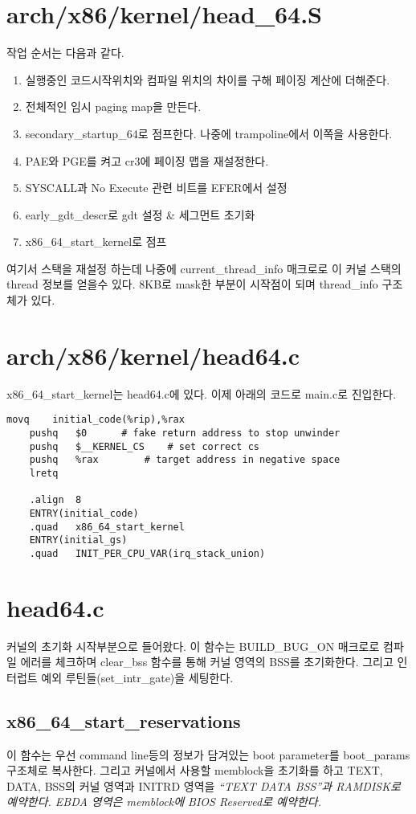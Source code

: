 \documentclass[a4paper,11pt]{report}
\begin{document}
\begin{CJK}{UTF8}{}
\section{arch/x86/kernel/head\_64.S}
작업 순서는 다음과 같다.
\begin{enumerate}
\item 실행중인 코드시작위치와 컴파일 위치의 차이를 구해 페이징 계산에 더해준다.
\item 전체적인 임시 paging map을 만든다.
\item secondary\_startup\_64로 점프한다. 나중에 trampoline에서 이쪽을 사용한다.
\item PAE와 PGE를 켜고 cr3에 페이징 맵을 재설정한다.
\item SYSCALL과 No Execute 관련 비트를 EFER에서 설정
\item early\_gdt\_descr로 gdt 설정 & 세그먼트 초기화
\item x86\_64\_start\_kernel로 점프
\end{enumerate}

여기서 스택을 재설정 하는데 나중에 current\_thread\_info 매크로로 이 커널 스택의 thread 정보를 얻을수 있다.
8KB로 mask한 부분이 시작점이 되며 thread\_info 구조체가 있다.

\section{arch/x86/kernel/head64.c}
x86\_64\_start\_kernel는 head64.c에 있다.
이제 아래의 코드로 main.c로 진입한다.

\begin{lstlisting}[label=lst:head64.c]
  	movq	initial_code(%rip),%rax
	pushq	$0		# fake return address to stop unwinder
	pushq	$__KERNEL_CS	# set correct cs
	pushq	%rax		# target address in negative space
	lretq

	.align	8
	ENTRY(initial_code)
	.quad	x86_64_start_kernel
	ENTRY(initial_gs)
	.quad	INIT_PER_CPU_VAR(irq_stack_union)

\end{lstlisting}

\section{head64.c}
커널의 초기화 시작부분으로 들어왔다.
이 함수는 BUILD\_BUG\_ON 매크로로 컴파일 에러를 체크하며 clear\_bss 함수를 통해 커널 영역의 BSS를 초기화한다.
그리고 인터럽트 예외 루틴들(set\_intr\_gate)을 세팅한다.

\subsection{x86\_64\_start\_reservations}
이 함수는 우선 command line등의 정보가 담겨있는 boot parameter를 boot\_params 구조체로 복사한다.
그리고 커널에서 사용할 memblock을 초기화를 하고 TEXT, DATA, BSS의 커널 영역과 INITRD 영역을  \em{``TEXT DATA BSS''}과  \em{RAMDISK}로  예약한다.
EBDA 영역은 memblock에 BIOS Reserved로 예약한다.


\end{CJK}
\end{document}
